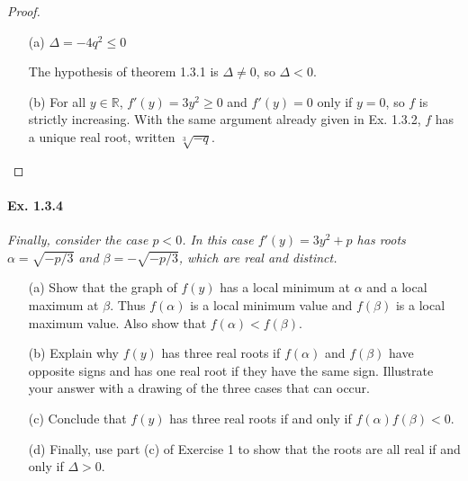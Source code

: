 \documentclass[11pt,a4paper]{article}
\begin{document}
\begin{proof}
\begin{enumerate}
 \item[(a)] $\Delta = -4q^2 \leq 0$
 
 The hypothesis of theorem 1.3.1 is $\Delta \neq 0$, so $\Delta <0$.
 
 \item[(b)]
For all $y \in \mathbb{R}$, $f'(y) = 3y^2 \geq 0$ and $f'(y) = 0$ only if $y=0$, so $f$ is strictly increasing. With the same argument already given in Ex. 1.3.2, $f$ has a unique real root, written $\sqrt[3]{-q}$.
\end{enumerate}
\end{proof}

\paragraph{Ex. 1.3.4} 

{\it Finally, consider the case $p<0$. In this case $f'(y) = 3y^2+p$ has roots $\alpha = \sqrt{-p/3}$ and $\beta = - \sqrt{-p/3}$, which are real and distinct.
\begin{enumerate}
\item[(a)] Show that the graph of $f(y)$ has a local minimum at $\alpha$ and a local maximum at $\beta$. Thus $f(\alpha)$ is a local minimum value and $f(\beta)$ is a local maximum value. Also show that $f(\alpha)<f(\beta)$.
\item[(b)] Explain why $f(y)$ has three real roots if $f(\alpha)$ and $f(\beta)$ have opposite signs and has one real root if they have the same sign. Illustrate your answer with a drawing of the three cases that can occur.
\item[(c)] Conclude that $f(y)$ has three real roots if and only if $f(\alpha)f(\beta)<0$.
\item[(d)] Finally, use part (c) of Exercise 1 to show that the roots are all real if and only if $\Delta >0$.

\end{enumerate}
}
\end{document}
